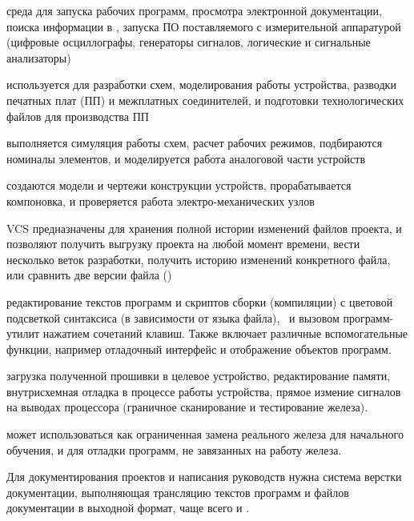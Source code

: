 \secdown\secdown


  среда для запуска рабочих программ, просмотра электронной документации, поиска
  информации в \internet, запуска ПО поставляемого с измерительной аппаратурой
  (цифровые осциллографы, генераторы сигналов, логические и сигнальные
  анализаторы)


  используется для разработки схем, моделирования работы устройства,
  разводки печатных плат (ПП) и межплатных соединителей, и подготовки
  технологических файлов для производства ПП

  
  выполняется симуляция работы схем, расчет рабочих режимов, подбираются
  номиналы элементов, и моделируется работа аналоговой части устройств
   

  создаются модели и чертежи конструкции устройств, прорабатывается
  компоновка, и проверяется работа электро-механических узлов


  VCS предназначены для хранения полной истории изменений файлов проекта, и
  позволяют получить выгрузку проекта на любой момент времени, вести несколько
  веток разработки, получить историю изменений конкретного файла, или сравнить
  две версии файла ()


  редактирование текстов программ и скриптов сборки (компиляции) с цветовой
  подсветкой синтаксиса (в зависимости от языка файла), \
  и вызовом программ-утилит нажатием сочетаний клавиш. Также включает различные
  вспомогательные функции, например отладочный интерфейс и отображение объектов
  программ.


  загрузка полученной прошивки в целевое устройство, редактирование памяти,
  внутрисхемная отладка в процессе работы устройства, прямое измение сигналов на
  выводах процессора (граничное сканирование и тестирование железа).


  может использоваться как ограниченная замена реального железа
  для начального обучения, и для отладки программ, не завязанных на работу
  железа.


  Для документирования проектов и написания руководств нужна система верстки
  документации, выполняющая трансляцию текстов программ и файлов
  документации в выходной формат, чаще всего \file{.pdf} и .
   
\secup\secup
